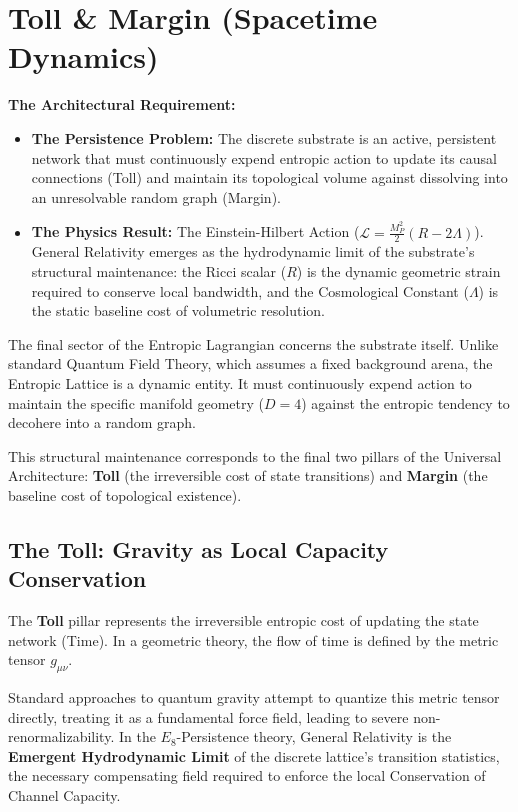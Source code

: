 \section{Toll \& Margin (Spacetime Dynamics)}
\label{sec:toll_margin}

\textbf{The Architectural Requirement:}
\begin{itemize}
    \item \textbf{The Persistence Problem:} The discrete substrate is an active, persistent network that must continuously expend entropic action to update its causal connections (Toll) and maintain its topological volume against dissolving into an unresolvable random graph (Margin).
    \item \textbf{The Physics Result:} The Einstein-Hilbert Action ($\mathcal{L} = \frac{M_P^2}{2}(R - 2\Lambda)$). General Relativity emerges as the hydrodynamic limit of the substrate's structural maintenance: the Ricci scalar ($R$) is the dynamic geometric strain required to conserve local bandwidth, and the Cosmological Constant ($\Lambda$) is the static baseline cost of volumetric resolution.
\end{itemize}

The final sector of the Entropic Lagrangian concerns the substrate itself. Unlike standard Quantum Field Theory, which assumes a fixed background arena, the Entropic Lattice is a dynamic entity. It must continuously expend action to maintain the specific manifold geometry ($D=4$) against the entropic tendency to decohere into a random graph.

This structural maintenance corresponds to the final two pillars of the Universal Architecture: \textbf{Toll} (the irreversible cost of state transitions) and \textbf{Margin} (the baseline cost of topological existence).

\subsection{The Toll: Gravity as Local Capacity Conservation}
The \textbf{Toll} pillar represents the irreversible entropic cost of updating the state network (Time). In a geometric theory, the flow of time is defined by the metric tensor $g_{\mu\nu}$. 

Standard approaches to quantum gravity attempt to quantize this metric tensor directly, treating it as a fundamental force field, leading to severe non-renormalizability. In the $E_8$-Persistence theory, General Relativity is the \textbf{Emergent Hydrodynamic Limit} of the discrete lattice's transition statistics, the necessary compensating field required to enforce the local Conservation of Channel Capacity.

